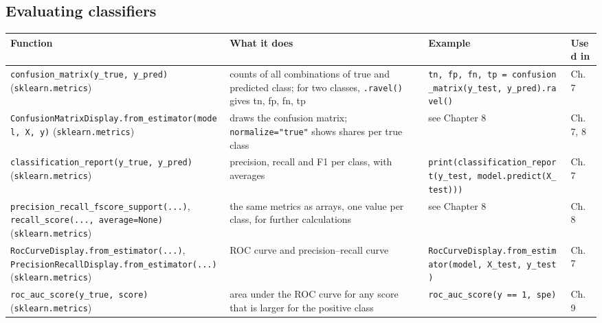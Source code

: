 \documentclass[
  letterpaper,
  DIV=11,
  numbers=noendperiod]{scrreprt}
\begin{document}
\subsection{Evaluating classifiers}\label{evaluating-classifiers-1}

\begin{longtable}[]{@{}
  >{\raggedright\arraybackslash}p{}
  >{\raggedright\arraybackslash}p{}
  >{\raggedright\arraybackslash}p{}
  >{\raggedright\arraybackslash}p{}@{}}
\toprule\noalign{}
\begin{minipage}[b]{\linewidth}\raggedright
Function
\end{minipage} & \begin{minipage}[b]{\linewidth}\raggedright
What it does
\end{minipage} & \begin{minipage}[b]{\linewidth}\raggedright
Example
\end{minipage} & \begin{minipage}[b]{\linewidth}\raggedright
Used in
\end{minipage} \\
\midrule\noalign{}
\endhead
\bottomrule\noalign{}
\endlastfoot
\texttt{confusion\_matrix(y\_true,\ y\_pred)} (\texttt{sklearn.metrics})
& counts of all combinations of true and predicted class; for two
classes, \texttt{.ravel()} gives tn, fp, fn, tp &
\texttt{tn,\ fp,\ fn,\ tp\ =\ confusion\_matrix(y\_test,\ y\_pred).ravel()}
& Ch. 7 \\
\texttt{ConfusionMatrixDisplay.from\_estimator(model,\ X,\ y)}
(\texttt{sklearn.metrics}) & draws the confusion matrix;
\texttt{normalize="true"} shows shares per true class & see Chapter 8 &
Ch. 7, 8 \\
\texttt{classification\_report(y\_true,\ y\_pred)}
(\texttt{sklearn.metrics}) & precision, recall and F1 per class, with
averages &
\texttt{print(classification\_report(y\_test,\ model.predict(X\_test)))}
& Ch. 7 \\
\texttt{precision\_recall\_fscore\_support(...)},
\texttt{recall\_score(...,\ average=None)} (\texttt{sklearn.metrics}) &
the same metrics as arrays, one value per class, for further
calculations & see Chapter 8 & Ch. 8 \\
\texttt{RocCurveDisplay.from\_estimator(...)},
\texttt{PrecisionRecallDisplay.from\_estimator(...)}
(\texttt{sklearn.metrics}) & ROC curve and precision--recall curve &
\texttt{RocCurveDisplay.from\_estimator(model,\ X\_test,\ y\_test)} &
Ch. 7 \\
\texttt{roc\_auc\_score(y\_true,\ score)} (\texttt{sklearn.metrics}) &
area under the ROC curve for any score that is larger for the positive
class & \texttt{roc\_auc\_score(y\ ==\ 1,\ spe)} & Ch. 9 \\
\end{longtable}
\end{document}
